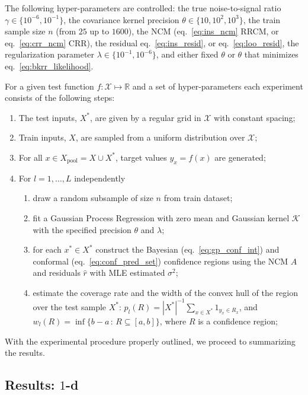 \documentclass[conference]{IEEEtran}
\newcommand{\Kcal}{\mathcal{K}}
\newcommand{\Xcal}{\mathcal{X}}
\newcommand{\Real}{\mathbb{R}}
\begin{document}
The following hyper-parameters are controlled: the true noise-to-signal ratio $\gamma
\in \{10^{-6}, 10^{-1}\}$, the covariance kernel precision $\theta \in \{10, 10^2, 10^3\}$,
the train sample size $n$ (from $25$ up to $1600$), the NCM (eq.~\ref{eq:ins_ncm}
RRCM, or eq.~\ref{eq:crr_ncm} CRR), the residual eq.~\ref{eq:ins_resid}, or eq.~\ref{eq:loo_resid},
the regularization parameter $\lambda \in \{10^{-1}, 10^{-6}\}$, and either fixed
$\theta$ or $\theta$ that minimizes eq.~\ref{eq:bkrr_likelihood}.

For a given test function $f:\Xcal \mapsto \Real$ and a set of hyper-parameters
each experiment consists of the following steps:
\begin{enumerate}
  \item The test inputs, $X^*$, are given by a regular grid in $\Xcal$ with constant
  spacing;
  \item Train inputs, $X$, are sampled from a uniform distribution over $\Xcal$;
  \item For all $x\in X_{\text{pool}} = X \cup X^*$, target values $y_x = f(x)$
  are generated;
  \item For $l=1,\ldots, L$ independently
  \begin{enumerate}
    \item draw a random subsample of size $n$ from train dataset;
    \item fit a Gaussian Process Regression with zero mean and Gaussian kernel
    $\Kcal$ with the specified precision $\theta$ and $\lambda$;
    \item for each $x^* \in X^*$ construct the Bayesian (eq.~\ref{eq:gp_conf_int})
    and conformal (eq.~\ref{eq:conf_pred_set}) confidence regions using the NCM $A$
    and residuals $\hat{r}$ with MLE estimated $\sigma^2$;
    \item estimate the coverage rate and the width of the convex hull of the region
    over the test sample $X^*$: $p_l(R) = |X^*|^{-1}\sum_{x\in X^*} 1_{y_x\in R_x}$,
    and $w_l(R) = \inf\{b-a\,:\,R \subseteq [a, b]\}$, where $R$ is a confidence
    region;
  \end{enumerate}
\end{enumerate}
With the experimental procedure properly outlined, we proceed to summarizing the
results.

\subsection{Results: $1$-d} %
\label{sub:results_1_d}
\end{document}
